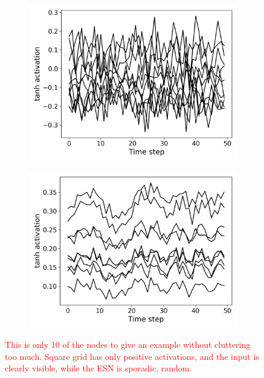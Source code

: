 \begin{figure}[t]
  \centering
  \begin{subfigure}{.49\textwidth}
    \centering
    \includegraphics[width=1.0\linewidth]{figures/esn-activations.png}
    \caption{}
    \label{}
  \end{subfigure}
  \begin{subfigure}{.49\textwidth}
    \centering
    \includegraphics[width=1.0\linewidth]{figures/sq-activations.png}
    \caption{}
    \label{}
  \end{subfigure}
  \caption{
    \textcolor{red}{
      This is only 10 of the nodes to give an example without cluttering too
much. Square grid has only positive activations, and the input is clearly
visible, while the ESN is sporadic, random.
    }
  }
  \label{}
\end{figure}

